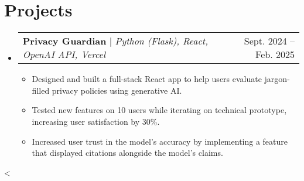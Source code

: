 \documentclass[letterpaper,11pt]{article}
\makeatletter
\newcommand{\resumeItem}[1]{
    \item\small{
            {#1 \vspace{-2pt}}
    }
}
\newcommand{\resumeProjectHeading}[2]{
    \item
    \begin{tabular*}{0.97\textwidth}{l@{\extracolsep{\fill}}r}
    \small#1 & #2 \\
    \end{tabular*}\vspace{-7pt}
}
\newcommand{\conditionalVspace}[1]{%
\ifnum\value{enumi}<\value{enumii}%
\vspace{#1}%
\fi
}
\newcommand{\resumeSubHeadingListStart}{\begin{itemize}[leftmargin=0.15in, label={}] \setlength{\itemsep}{7pt}}
\newcommand{\resumeSubHeadingListEnd}{\end{itemize}\conditionalVspace{7pt}}
\newcommand{\resumeItemListStart}{\begin{itemize}}
\newcommand{\resumeItemListEnd}{\end{itemize}\vspace{-5pt}}
\makeatother
\begin{document}
\section{Projects}
\resumeSubHeadingListStart
\resumeProjectHeading
{\textbf{Privacy Guardian} $|$ \emph{Python (Flask), React, OpenAI API, Vercel}}{Sept. 2024 -- Feb. 2025}
\resumeItemListStart
\resumeItem{Designed and built a full-stack React app to help users evaluate jargon-filled privacy policies using generative AI.}
\resumeItem{Tested new features on 10 users while iterating on technical prototype, increasing user satisfaction by 30\%.}
\resumeItem{Increased user trust in the model's accuracy by implementing a feature that displayed citations alongside the model's claims.}
\resumeItemListEnd
\resumeSubHeadingListEnd


%


\end{document}
